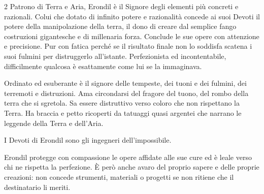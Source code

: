 \begin{multicols}{2}
Patrono di Terra e Aria, Erondil è il Signore degli elementi più concreti e razionali. Colui che dotato di infinito potere e razionalità concede ai suoi Devoti il potere della manipolazione della terra, il dono di creare dal semplice fango costruzioni gigantesche e di millenaria forza. Conclude le sue opere con attenzione e precisione.
Pur con fatica perché se il risultato finale non lo soddisfa scatena i suoi fulmini per distruggerlo all'istante. Perfezionista ed incontentabile, difficilmente qualcosa è esattamente come lui se la immaginava.

Ordinato ed esuberante è il signore delle tempeste, dei tuoni e dei fulmini, dei terremoti e distruzioni. Ama circondarsi del fragore del tuono, del rombo della terra che si sgretola. Sa essere distruttivo verso coloro che non rispettano la Terra.
Ha braccia e petto ricoperti da tatuaggi quasi argentei che narrano le leggende della Terra e dell'Aria.

I Devoti di Erondil sono gli ingegneri dell'impossibile.

Erondil protegge con compassione le opere affidate alle sue cure ed è leale verso chi ne rispetta la perfezione. È però anche avaro del proprio sapere e delle proprie creazioni: non concede strumenti, materiali o progetti se non ritiene che il destinatario li meriti.


\end{multicols}
